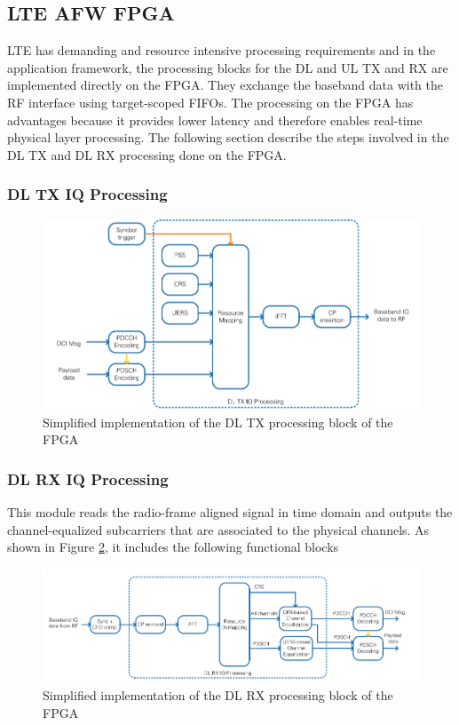 \subsection{LTE AFW FPGA}\label{ssec:LTEAFWFPGA}
LTE has demanding and resource intensive processing requirements and in the application framework, the processing blocks for the DL and UL TX and RX are implemented directly on the FPGA. They exchange the baseband data with the RF interface using target-scoped FIFOs. The processing on the FPGA has advantages because it provides lower latency and therefore enables real-time physical layer processing. The following section describe the steps involved in the DL TX and DL RX processing done on the FPGA.

\subsubsection{DL TX IQ Processing}\label{sssec:DLTXIQProc}

\begin{figure}[!htb]
    \centering
    \includegraphics[width=\linewidth]{images/DLFPGATXImpl.png}
    \caption{Simplified implementation of the DL TX processing block of the FPGA}
    \label{fig:LTEAFWFPGADLTXProc}
\end{figure}

\subsubsection{DL RX IQ Processing}\label{sssec:DLRXIQProc}

This module reads the radio-frame aligned signal in time domain and outputs the channel-equalized subcarriers that are associated to the physical channels. As shown in Figure \ref{fig:LTEAFWFPGADLRXProc}, it includes the following functional blocks

\begin{figure}[!htb]
    \centering
    \includegraphics[width=\linewidth]{images/DLFPGARXImpl.png}
    \caption{Simplified implementation of the DL RX processing block of the FPGA}
    \label{fig:LTEAFWFPGADLRXProc}
\end{figure}


